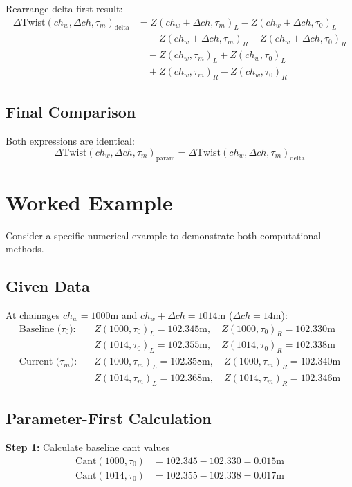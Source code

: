 \documentclass{article}
\begin{document}
Rearrange delta-first result:
\begin{align}
\Delta\text{Twist}(ch_w, \Delta ch, \tau_m)_{\text{delta}} &= Z(ch_w + \Delta ch, \tau_m)_L - Z(ch_w + \Delta ch, \tau_0)_L \nonumber \\
&\quad - Z(ch_w + \Delta ch, \tau_m)_R + Z(ch_w + \Delta ch, \tau_0)_R \nonumber \\
&\quad - Z(ch_w, \tau_m)_L + Z(ch_w, \tau_0)_L \nonumber \\
&\quad + Z(ch_w, \tau_m)_R - Z(ch_w, \tau_0)_R
\end{align}

\subsection{Final Comparison}
Both expressions are identical:
\begin{equation}
\Delta\text{Twist}(ch_w, \Delta ch, \tau_m)_{\text{param}} = \Delta\text{Twist}(ch_w, \Delta ch, \tau_m)_{\text{delta}}
\end{equation}

\section{Worked Example}
Consider a specific numerical example to demonstrate both computational methods.

\subsection{Given Data}
At chainages $ch_w = 1000$m and $ch_w + \Delta ch = 1014$m ($\Delta ch = 14$m):
\begin{align}
\text{Baseline (}\tau_0\text{):} \quad &Z(1000, \tau_0)_L = 102.345\text{m}, \quad Z(1000, \tau_0)_R = 102.330\text{m} \nonumber \\
&Z(1014, \tau_0)_L = 102.355\text{m}, \quad Z(1014, \tau_0)_R = 102.338\text{m} \\[0.5em]
\text{Current (}\tau_m\text{):} \quad &Z(1000, \tau_m)_L = 102.358\text{m}, \quad Z(1000, \tau_m)_R = 102.340\text{m} \nonumber \\
&Z(1014, \tau_m)_L = 102.368\text{m}, \quad Z(1014, \tau_m)_R = 102.346\text{m}
\end{align}

\subsection{Parameter-First Calculation}
\textbf{Step 1:} Calculate baseline cant values
\begin{align}
\text{Cant}(1000, \tau_0) &= 102.345 - 102.330 = 0.015\text{m} \\
\text{Cant}(1014, \tau_0) &= 102.355 - 102.338 = 0.017\text{m}
\end{align}
\end{document}

